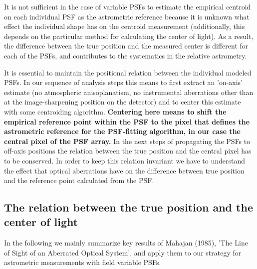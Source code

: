 It is not sufficient in the case of variable PSFs to estimate the empirical centroid on each individual PSF as the astrometric reference because it is unknown what effect the individual shape has on the centroid measurement (additionally, this depends on the particular method for calculating the center of light). As a result, the difference between the true position and the measured center is different for each of the PSFs, and contributes to the systematics in the relative astrometry.

It is essential to maintain the positional relation between the individual modeled PSFs. In our sequence of analysis steps this means to first extract an 'on-axis' estimate (no atmospheric anisoplanatism, no instrumental aberrations other than at the image-sharpening position on the detector) and to center this estimate with some centroiding algorithm. {\bf Centering here means to shift the empirical reference point within the PSF to the pixel that defines the astrometric reference for the PSF-fitting algorithm, in our case the central pixel of the PSF array.} In the next steps of propagating the PSFs to off-axis positions the relation between the true position and the central pixel has to be conserved. In order to keep this relation invariant we have to understand the effect that optical aberrations have on the difference between true position and the reference point calculated from the PSF.  

\subsection{The relation between the true position and the center of light}

In the following we mainly summarize key results of Mahajan (1985), 'The Line of Sight of an Aberrated Optical System', and apply them to our strategy for astrometric measurements with field variable PSFs.
